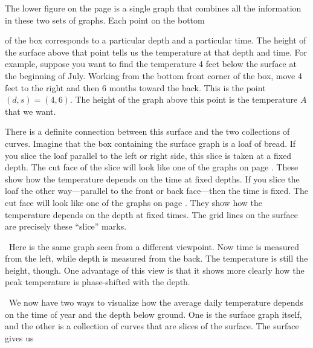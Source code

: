 {{{{	The lower figure on the page is a single graph that combines all the information in these two sets of graphs.  Each point on the bottom 
\linebreak

\mbox{}

\vspace{150pt}
\label{depthgraph}
	
\noindent
of the box corresponds to a particular depth and a particular time.  The height of the surface above that point tells us the temperature at that depth and time.  
For example, suppose you want to find the temperature 4 feet below the surface at the beginning of July.  Working from the bottom front corner of the box, move 4 feet to the right and then 6 months toward the back.  This is the point $(d, s) = (4, 6)$.  The height of the graph above this point is the temperature $A$ that we want.
    	
	
\newpage

	There is a definite connection between this surface and the two collections of curves.  
Imagine that the box containing the surface graph is a loaf of bread.  If you slice the loaf parallel to the left or right side, this slice is taken at a fixed depth.  The cut face of the slice will look like one of the graphs on page \pageref{timegraph}.  These show how the temperature depends on the time at fixed depths.  If you slice the loaf the other way---parallel to the front or back face---then the time is fixed.  The cut face will look like one of the graphs on page \pageref{depthgraph}.  They show how the temperature depends on the depth at fixed times.  The grid lines on the surface are precisely these ``slice'' marks. 


\hfill
\quad \ Here is the same graph seen from a different viewpoint.  Now time is measured from the left, while depth is measured from the back.  The temperature is still the height, though.  One advantage of this view is that it shows more clearly how the peak temperature is phase-shifted with the depth.

\quad \ We now have two ways to visualize how the average daily temperature depends on the time of year and the depth below ground.  One is the surface graph itself, and the other is a collection of curves that are slices of the surface.  The surface gives us 
\linebreak
\vspace{-9pt}

}}}}
